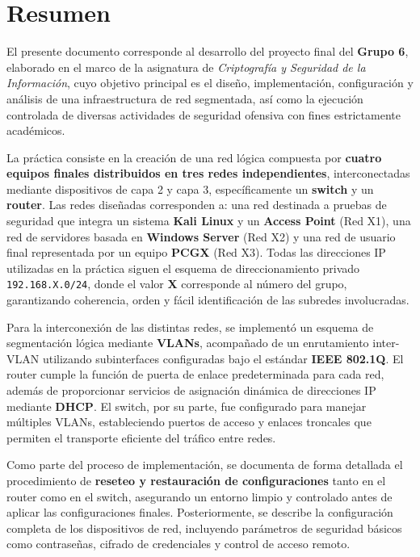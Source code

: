 \section*{Resumen}

El presente documento corresponde al desarrollo del proyecto final del \textbf{Grupo 6}, elaborado en el marco de la asignatura de \textit{Criptografía y Seguridad de la Información}, cuyo objetivo principal es el diseño, implementación, configuración y análisis de una infraestructura de red segmentada, así como la ejecución controlada de diversas actividades de seguridad ofensiva con fines estrictamente académicos.

La práctica consiste en la creación de una red lógica compuesta por \textbf{cuatro equipos finales distribuidos en tres redes independientes}, interconectadas mediante dispositivos de capa 2 y capa 3, específicamente un \textbf{switch} y un \textbf{router}. Las redes diseñadas corresponden a: una red destinada a pruebas de seguridad que integra un sistema \textbf{Kali Linux} y un \textbf{Access Point} (Red X1), una red de servidores basada en \textbf{Windows Server} (Red X2) y una red de usuario final representada por un equipo \textbf{PCGX} (Red X3). Todas las direcciones IP utilizadas en la práctica siguen el esquema de direccionamiento privado \texttt{192.168.X.0/24}, donde el valor \textbf{X} corresponde al número del grupo, garantizando coherencia, orden y fácil identificación de las subredes involucradas.

Para la interconexión de las distintas redes, se implementó un esquema de segmentación lógica mediante \textbf{VLANs}, acompañado de un enrutamiento inter-VLAN utilizando subinterfaces configuradas bajo el estándar \textbf{IEEE 802.1Q}. El router cumple la función de puerta de enlace predeterminada para cada red, además de proporcionar servicios de asignación dinámica de direcciones IP mediante \textbf{DHCP}. El switch, por su parte, fue configurado para manejar múltiples VLANs, estableciendo puertos de acceso y enlaces troncales que permiten el transporte eficiente del tráfico entre redes.

Como parte del proceso de implementación, se documenta de forma detallada el procedimiento de \textbf{reseteo y restauración de configuraciones} tanto en el router como en el switch, asegurando un entorno limpio y controlado antes de aplicar las configuraciones finales. Posteriormente, se describe la configuración completa de los dispositivos de red, incluyendo parámetros de seguridad básicos como contraseñas, cifrado de credenciales y control de acceso remoto.

